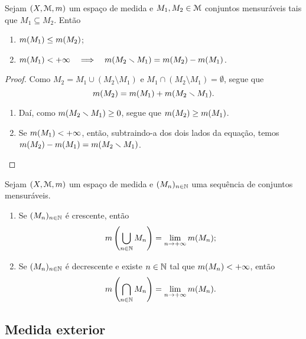 \begin{proposition}
Sejam $(X, \mathcal{M},m)$ um espaço de medida e $M_1,M_2 \in \mathcal{M}$ conjuntos mensuráveis tais que $M_1 \subseteq M_2$. Então
	\begin{enumerate}
	\item $m(M_1) \leq m(M_2)$;
	\item $m(M_1) < + \infty \quad \Longrightarrow \quad m(M_2 \smallsetminus M_1) = m(M_2) - m(M_1)$.
	\end{enumerate}
\end{proposition}
\begin{proof}
	Como $M_2 = M_1 \cup (M_2 \setminus M_1)$ e $M_1 \cap (M_2 \setminus M_1) = \emptyset$, segue que
	\begin{equation*}
	m(M_2)=m(M_1)+m(M_2 \smallsetminus M_1).
	\end{equation*}
	\begin{enumerate}
	\item Daí, como $m(M_2 \smallsetminus M_1) \geq 0$, segue que $m(M_2) \geq m(M_1)$.
	\item Se $m(M_1) < + \infty$, então, subtraindo-a dos dois lados da equação, temos $m(M_2)-m(M_1)=m(M_2 \smallsetminus M_1)$.
	\end{enumerate}
\end{proof}

\begin{proposition}
Sejam $(X, \mathcal{M},m)$ um espaço de medida e $(M_n)_{n \in \mathbb{N}}$ uma sequência de conjuntos mensuráveis.
	\begin{enumerate}
	\item Se $(M_n)_{n \in \mathbb{N}}$ é crescente, então
		\begin{equation*}
		m \left( \bigcup_{n \in \mathbb{N}} M_n \right) = \lim_{n \to +\infty} m(M_n);
		\end{equation*}
	\item Se $(M_n)_{n \in \mathbb{N}}$ é decrescente e existe $n \in \mathbb{N}$ tal que $m(M_n) < + \infty$, então
		\begin{equation*}
		m \left( \bigcap_{n \in \mathbb{N}} M_n \right) = \lim_{n \to +\infty} m(M_n).
		\end{equation*}
	\end{enumerate}
\end{proposition}







\subsection{Medida exterior}

